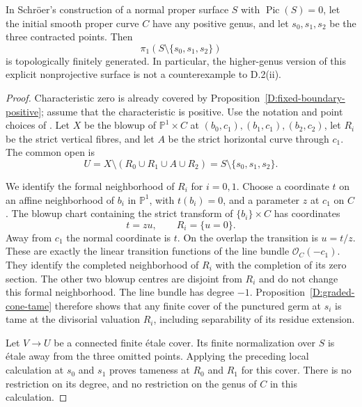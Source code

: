 \begin{corollary}
\label{D:schroer-all-genera}
In Schr\"oer's construction of a normal proper surface $S$ with
$\operatorname{Pic}(S)=0$, let the initial smooth proper curve
$C$ have any positive genus, and let $s_0,s_1,s_2$ be the three
contracted points.  Then
\[
                  \pi_1(S\setminus\{s_0,s_1,s_2\})
\]
is topologically finitely generated.  In particular, the
higher-genus version of this explicit nonprojective surface is
not a counterexample to D.2(ii).
\end{corollary}
\begin{proof}
Characteristic zero is already covered by
Proposition~\ref{D:fixed-boundary-positive}; assume that the
characteristic is positive.  Use the notation and point choices
of \cite[\S\S2.5 and 3.1--3.2, author's PDF pp.~4--5]{Schroer1999D}.
Let $X$ be the blowup of $\mathbb P^1\times C$ at
$(b_0,c_1),(b_1,c_1),(b_2,c_2)$, let $R_i$ be the strict
vertical fibres, and let $A$ be the strict horizontal curve
through $c_1$.  The common open is
\[
 U=X\setminus(R_0\cup R_1\cup A\cup R_2)
   =S\setminus\{s_0,s_1,s_2\}.
\]

We identify the formal neighborhood of $R_i$ for $i=0,1$.
Choose a coordinate $t$ on an affine neighborhood of $b_i$
in $\mathbb P^1$, with $t(b_i)=0$, and a parameter $z$ at
$c_1$ on $C$.  The blowup chart containing the strict transform
of $\{b_i\}\times C$ has coordinates
\[
                t=zu,\qquad R_i=\{u=0\}.
\]
Away from $c_1$ the normal coordinate is $t$.  On the overlap
the transition is $u=t/z$.  These are exactly the linear
transition functions of the line bundle
$\mathcal O_C(-c_1)$.  They identify the completed neighborhood
of $R_i$ with the completion of its zero section.  The other
two blowup centres are disjoint from $R_i$ and do not change
this formal neighborhood.  The line bundle has degree $-1$.
Proposition~\ref{D:graded-cone-tame} therefore shows that any
finite cover of the punctured germ at $s_i$ is tame at the
divisorial valuation $R_i$, including separability of its
residue extension.

Let $V\to U$ be a connected finite \'etale cover.  Its finite
normalization over $S$ is \'etale away from the three omitted
points.  Applying the preceding local calculation at $s_0$
and $s_1$ proves tameness at $R_0$ and $R_1$ for this cover.
There is no restriction on its degree, and no restriction on
the genus of $C$ in this calculation.


\end{proof}
